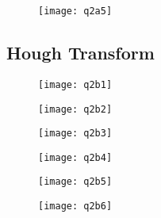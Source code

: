 	\begin{figure}[position = here]
		\begin{centering}
			\texttt{[image: q2a5]}\\
			\caption[\textit{RPYAxes}]{}
		\end{centering}
	\end{figure}
	\newline				
	
	\pagebreak
	\subsection{Hough Transform}
	
	
	\linebreak
	
	\begin{figure}[position = here]
	\begin{centering}
		\texttt{[image: q2b1]}\\
		\caption[\textit{RPYAxes}]{}
	\end{centering}
\end{figure}
\newline	

\begin{figure}[position = here]
\begin{centering}
	\texttt{[image: q2b2]}\\
	\caption[\textit{RPYAxes}]{}
\end{centering}
\end{figure}
\newline	

\begin{figure}[position = here]
\begin{centering}
	\texttt{[image: q2b3]}\\
	\caption[\textit{RPYAxes}]{}
\end{centering}
\end{figure}
\newline	


\begin{figure}[position = here]
\begin{centering}
	\texttt{[image: q2b4]}\\
	\caption[\textit{RPYAxes}]{}
\end{centering}
\end{figure}
\newline	


\begin{figure}[position = here]
\begin{centering}
	\texttt{[image: q2b5]}\\
	\caption[\textit{RPYAxes}]{}
\end{centering}
\end{figure}
\newline	


\begin{figure}[position = here]
\begin{centering}
	\texttt{[image: q2b6]}\\
	\caption[\textit{RPYAxes}]{}
\end{centering}
\end{figure}
\newline